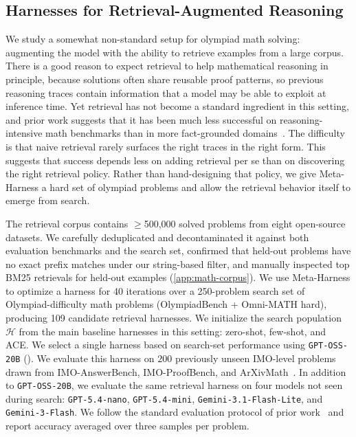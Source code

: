 \subsection{Harnesses for Retrieval-Augmented Reasoning}
\label{subsec:math-reasoning}

We study a somewhat non-standard setup for olympiad math solving: augmenting the model with the ability to retrieve examples from a large corpus.
There is a good reason to expect retrieval to help mathematical reasoning in principle, because solutions often share reusable proof patterns, so previous reasoning traces contain information that a model may be able to exploit at inference time.
Yet retrieval has not become a standard ingredient in this setting, and prior work suggests that it has been much less successful on reasoning-intensive math benchmarks than in more fact-grounded domains~\citep{shakya2026adaptiveretrievalhelpsreasoning,xiao2024rarbreasoningretrievalbenchmark,balunovic_srimatharena_2025}.
The difficulty is that naive retrieval rarely surfaces the right traces in the right form.
This suggests that success depends less on adding retrieval per se than on discovering the right retrieval policy.
Rather than hand-designing that policy, we give Meta-Harness a hard set of olympiad problems and allow the retrieval behavior itself to emerge from search.

The retrieval corpus contains $\geq$500,000 solved problems from eight open-source datasets.
We carefully deduplicated and decontaminated it against both evaluation benchmarks and the search set, confirmed that held-out problems have no exact prefix matches under our string-based filter, and manually inspected top BM25 retrievals for held-out examples (\cref{app:math-corpus}).
We use Meta-Harness to optimize a harness for 40 iterations over a 250-problem search set of Olympiad-difficulty math problems (OlympiadBench + Omni-MATH hard), producing 109 candidate retrieval harnesses.
We initialize the search population $\mathcal{H}$ from the main baseline harnesses in this setting: zero-shot, few-shot, and ACE.
We select a single harness based on search-set performance using \texttt{GPT-OSS-20B} ().
We evaluate this harness on $200$ previously unseen IMO-level problems drawn from IMO-AnswerBench, IMO-ProofBench, and ArXivMath~\citep{imobenchmarks2025,balunovic_srimatharena_2025}.
In addition to \texttt{GPT-OSS-20B}, we evaluate the same retrieval harness on four models not seen during search: \texttt{GPT-5.4-nano}, \texttt{GPT-5.4-mini}, \texttt{Gemini-3.1-Flash-Lite}, and \texttt{Gemini-3-Flash}.
We follow the standard evaluation protocol of prior work~\citep{imobenchmarks2025} and report accuracy averaged over three samples per problem.

